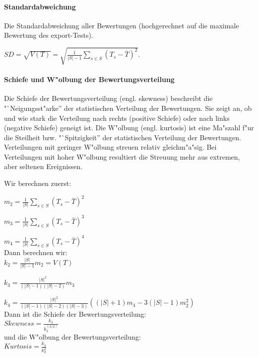 \documentclass[12pt]{report}
\begin{document}
\paragraph{Standardabweichung}
Die Standardabweichung aller Bewertungen (hochgerechnet auf die maximale Bewertung des export-Tests).

$SD = \sqrt{V(T)} = \sqrt{\frac{1}{|S| - 1}\sum\limits_{s\in S}(T_s - \bar{T})^2}$.

\paragraph{Schiefe und W"olbung der Bewertungsverteilung}

Die Schiefe der Bewertungsverteilung (engl. skewness) beschreibt die "`Neigungsst"arke'' der statistischen Verteilung der Bewertungen. Sie zeigt an, ob und wie stark die Verteilung nach rechts (positive Schiefe) oder nach links (negative Schiefe) geneigt ist.
Die W"olbung (engl. kurtosis) ist eine Ma"szahl f"ur die Steilheit bzw. "`Spitzigkeit'' der statistischen Verteilung der Bewertungen. Verteilungen mit geringer W"olbung streuen relativ gleichm"a"sig. Bei Verteilungen mit hoher W"olbung resultiert die Streuung mehr aus extremen, aber seltenen Ereignissen.

Wir berechnen zuerst:

$m_2=\frac{1}{|S|}\sum\limits_{s\in S}{(T_s - \bar{T})^2}$

$m_3=\frac{1}{|S|}\sum\limits_{s\in S}{(T_s - \bar{T})^3}$

$m_4=\frac{1}{|S|}\sum\limits_{s\in S}{(T_s - \bar{T})^4}$\\

Dann berechnen wir:\\

$k_2 = \frac{|S|}{|S| - 1}m_2 = V(T)$

$k_3 = \frac{|S|^2}{(|S|-1)(|S|-2)} m_3$

$k_4 = \frac{|S|^2}{(|S|-1)(|S|-2)(|S|-3)}\left((|S|+1)m_4-3(|S|-1)m_2^2\right)$\\

Dann ist die Schiefe der Bewertungsverteilung:\\

 $Skewness = \frac{k_3}{k_2^(3/2)}$\\

und die W"olbung der Bewertungsverteilung:\\

 $Kurtosis = \frac{k_4}{k_2^2}$
\end{document}
